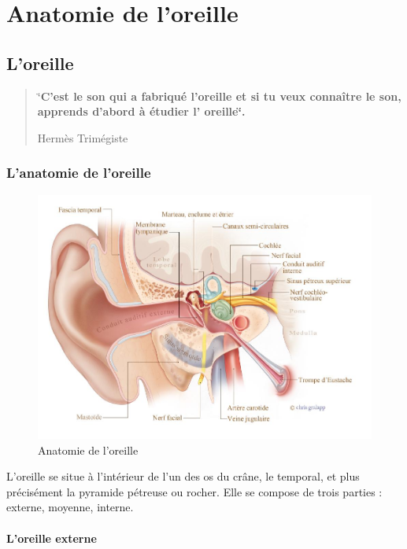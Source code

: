 \chapter {Anatomie de l'oreille}

\section {L'oreille}


\begin{quotation}
	\char`\"{}\textbf{C'est le son qui a fabriqué l'oreille et si tu veux connaître
		le son, apprends d'abord à étudier l\textquoteright
                oreille\char`\"{}.}

              
	Hermès Trimégiste 
\end{quotation}

\subsection{L'anatomie de l'oreille}
\begin{figure}
	\centering
	\includegraphics[width=1\linewidth]{images/20160624Berufsfeldgruppen.jpg}
	\caption[Anatomie oreille]{Anatomie de l'oreille}
	\label{fig:-20160624berufsfeldgruppen}
\end{figure}

L'oreille \autocite[ch. 8 pp. 319--321]{marieb:biologie} 
se situe à l'intérieur de l'un des os du crâne, le temporal, et plus précisément la pyramide pétreuse ou rocher. Elle se compose de trois parties : externe, moyenne, interne.

\subsubsection{L'oreille externe}


